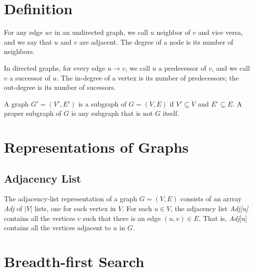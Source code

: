 \section{Definition}

\vspace{\parskip}

\begin{definition}      
    For any edge $uv$ in an undirected graph, we call $u$ neighbor of $v$ and vice versa, and we say that $u$ and $v$ are adjacent. The degree of a node is its number of neighbors.

    In directed graphs, for every edge $u \to v$, we call $u$ a predecessor of $v$, and we call $v$ a successor of $u$. The in-degree of a vertex is its number of predecessors; the out-degree is its number of sucessors.
\end{definition}

\begin{definition}[Subgraphs] 
    A graph $G' = (V',E')$ is a subgraph of $G=(V,E)$ if $V' \subseteq V$ and $E' \subseteq E$. A proper subgraph of $G$ is any subgraph that is not $G$ itself.
\end{definition}

\section{Representations of Graphs}

\subsection{Adjacency List}

\vspace{\parskip}

\begin{definition} 
    The adjacency-list representation of a graph $G=(V,E)$ consists of an arrray \textit{Adj} of $|V|$ lists, one for each vertex in $V$. For each $u \in V$, the adjacency list \textit{Adj[u]} contains all the vertices $v$ such that there is an edge $(u,v) \in E$. That is, \textit{Adj}[u] contains all the vertices adjacent to $u$ in $G$.
\end{definition}

\section{Breadth-first Search} 

